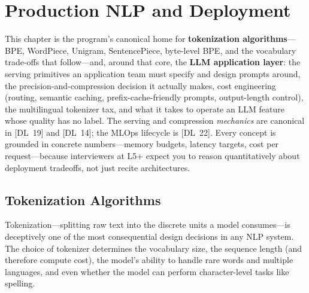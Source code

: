 
\chapter{Production NLP and Deployment}
\label{chap:production_nlp}

\begin{tldr}
This chapter is the program's canonical home for \textbf{tokenization
algorithms}---BPE, WordPiece, Unigram, SentencePiece, byte-level BPE, and the vocabulary
trade-offs that follow---and, around that core, the \textbf{LLM application layer}: the
serving primitives an application team must specify and design prompts around, the
precision-and-compression decision it actually makes, cost engineering (routing, semantic
caching, prefix-cache-friendly prompts, output-length control), the multilingual tokenizer
tax, and what it takes to operate an LLM feature whose quality has no label.  The serving
and compression \emph{mechanics} are canonical in [DL~19] and [DL~14]; the MLOps lifecycle
is [DL~22].  Every concept is grounded in concrete numbers---memory budgets, latency
targets, cost per request---because interviewers at L5+ expect you to reason quantitatively
about deployment tradeoffs, not just recite architectures.
\end{tldr}

\bigskip

\section{Tokenization Algorithms}
\label{sec:tokenization_algorithms}

Tokenization---splitting raw text into the discrete units a model consumes---is deceptively
one of the most consequential design decisions in any NLP system.  The choice of tokenizer
determines the vocabulary size, the sequence length (and therefore compute cost), the model's
ability to handle rare words and multiple languages, and even whether the model can perform
character-level tasks like spelling.

